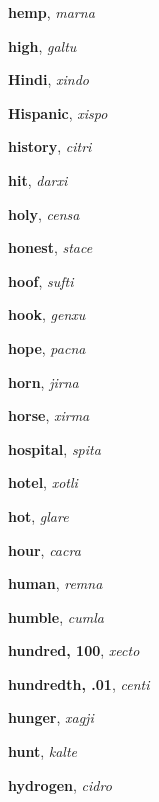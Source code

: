 \documentclass[12pt]{book}
\begin{document}
\begin{description}
\item[ ] \textbf{hemp}, \textit{marna}

\item[ ] \textbf{high}, \textit{galtu}

\item[ ] \textbf{Hindi}, \textit{xindo}

\item[ ] \textbf{Hispanic}, \textit{xispo}

\item[ ] \textbf{history}, \textit{citri}

\item[ ] \textbf{hit}, \textit{darxi}

\item[ ] \textbf{holy}, \textit{censa}

\item[ ] \textbf{honest}, \textit{stace}

\item[ ] \textbf{hoof}, \textit{sufti}

\item[ ] \textbf{hook}, \textit{genxu}

\item[ ] \textbf{hope}, \textit{pacna}

\item[ ] \textbf{horn}, \textit{jirna}

\item[ ] \textbf{horse}, \textit{xirma}

\item[ ] \textbf{hospital}, \textit{spita}

\item[ ] \textbf{hotel}, \textit{xotli}

\item[ ] \textbf{hot}, \textit{glare}

\item[ ] \textbf{hour}, \textit{cacra}

\item[ ] \textbf{human}, \textit{remna}

\item[ ] \textbf{humble}, \textit{cumla}

\item[ ] \textbf{hundred, 100}, \textit{xecto}

\item[ ] \textbf{hundredth, .01}, \textit{centi}

\item[ ] \textbf{hunger}, \textit{xagji}

\item[ ] \textbf{hunt}, \textit{kalte}

\item[ ] \textbf{hydrogen}, \textit{cidro}



\end{description}
\end{document}
